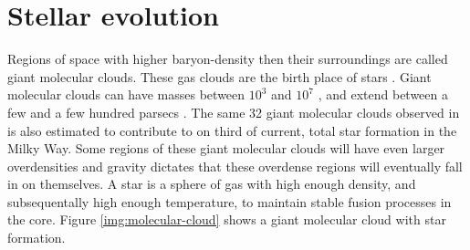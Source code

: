 \pagebreak
\section{Stellar evolution}
\nopagebreak


Regions of space with higher baryon-density then their surroundings are called giant molecular clouds.
These gas clouds are the birth place of stars \linebreak {}.
Giant molecular clouds can have masses between $10^3$ and $10^7$ \msol, and extend between a few and a few hundred parsecs .
The same 32 giant molecular clouds observed in  is also estimated to contribute to on third of current, total star formation in the Milky Way.
Some regions of these giant molecular clouds will have even larger overdensities and gravity dictates that these overdense regions will eventually fall in on themselves.
A star is a sphere of gas with high enough density, and subsequentally high enough temperature, to maintain stable fusion processes in the core.
Figure \ref{img:molecular-cloud} shows a giant molecular cloud with star formation. 

